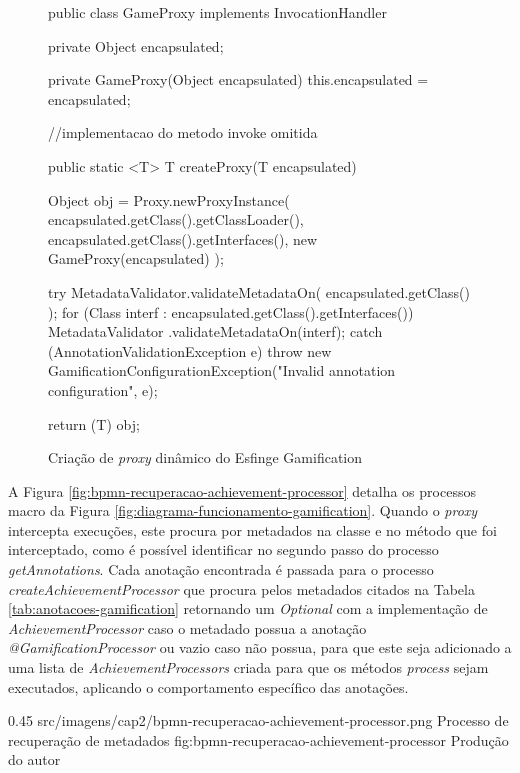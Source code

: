 \begin{figure}[H]
    \centering
    \caption{Criação de \textit{proxy} dinâmico do Esfinge Gamification}
    \begin{java}
public class GameProxy implements InvocationHandler {
        private Object encapsulated;

	private GameProxy(Object encapsulated) {
		this.encapsulated = encapsulated;
        }
        
//implementacao do metodo invoke omitida
    
	public static <T> T createProxy(T encapsulated) {
		Object obj = Proxy.newProxyInstance(
		        encapsulated.getClass().getClassLoader(),
			encapsulated.getClass().getInterfaces(), 
			new GameProxy(encapsulated)
		);

		try {
			MetadataValidator.validateMetadataOn(
			    encapsulated.getClass()
			);
			for (Class interf : encapsulated.getClass().getInterfaces()) {
				MetadataValidator
				.validateMetadataOn(interf);
			}
		} catch (AnnotationValidationException e) {
			throw new GamificationConfigurationException("Invalid annotation configuration", e);
		}

		return (T) obj;
	}
}
    \end{java}
    \label{fig:gamification-proxy}
\end{figure}

A Figura \ref{fig:bpmn-recuperacao-achievement-processor} detalha os processos macro da Figura \ref{fig:diagrama-funcionamento-gamification}. Quando o \textit{proxy} intercepta execuções, este procura por metadados na classe e no método que foi interceptado, como é possível identificar no segundo passo do processo \textit{getAnnotations}. %
Cada anotação encontrada é passada para o processo \textit{createAchievementProcessor} que procura pelos metadados citados na Tabela \ref{tab:anotacoes-gamification} retornando um \textit{Optional} com a implementação de \textit{AchievementProcessor} caso o metadado possua a anotação \textit{@GamificationProcessor} ou vazio caso não possua, para que este seja adicionado a uma lista de \textit{AchievementProcessors} criada para que os métodos \textit{process} sejam executados, aplicando o comportamento específico das anotações.

\begin{image}
{0.45} %
{src/imagens/cap2/bpmn-recuperacao-achievement-processor.png} %
{Processo de recuperação de metadados} %
{fig:bpmn-recuperacao-achievement-processor} %
{Produção do autor} %
\end{image}

